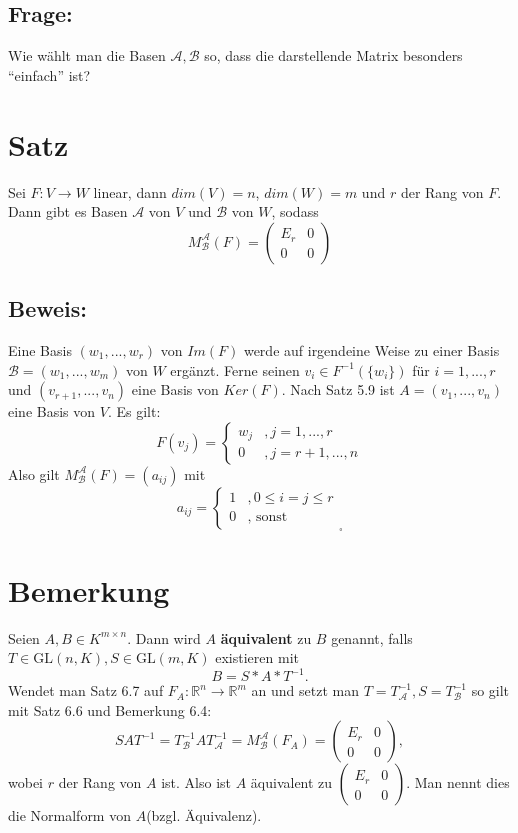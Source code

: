 \documentclass{scrbook}
\begin{document}
\subsection*{Frage:}
Wie wählt man die Basen $\mathscr{A},\mathscr{B}$ so, dass die darstellende Matrix besonders "`einfach"' ist?
\section{Satz} Sei $F:V\rightarrow W$ linear, dann $dim(V)=n$, $dim(W)=m$ und $r$ der Rang von $F$. Dann gibt es Basen $\mathscr{A}$ von $V$ und $\mathscr{B}$ von $W$, sodass \[
M^\mathscr{A}_\mathscr{B}(F)= \left(
\begin{array}{cc}
E_r&0\\
0&0
\end{array}
\right)
\]
\subsection*{Beweis:}
Eine Basis $(w_1,...,w_r)$ von $Im(F)$ werde auf irgendeine Weise zu einer Basis $\mathscr{B}=(w_1,...,w_m)$ von $W$ ergänzt. Ferne seinen $v_i \in F^{-1}(\{w_i\})$ für $i=1,...,r$ und $(v_{r+1},...,v_n)$ eine Basis von $Ker(F)$. Nach Satz 5.9 ist $A=(v_1,...,v_n)$ eine Basis von $V$. Es gilt:\[
F(v_j)=\left\{
\begin{array}{ll}
w_j&,j=1,...,r\\
0&,j=r+1,...,n
\end{array}
\right.
\]
Also gilt $M^\mathscr{A}_\mathscr{B}(F)=(a_{ij})$ mit
\[
a_{ij}= \left\{
\begin{array}{ll}
1&, 0\leq i=j \leq r\\
0&, \text{ sonst}
\end{array}
\right. _\square
\]
\section{Bemerkung}
Seien $A,B\in K^{m\times n}$. Dann wird $A$ \textbf{äquivalent} zu $B$ genannt, falls $T\in \text{GL}(n,K),S\in \text{GL}(m,K)$ existieren mit \[B=S*A*T^{-1}.\]Wendet man Satz 6.7 auf $F_A:\mathbb{R}^n \rightarrow \mathbb{R}^m$ an und setzt man $T=T^{-1}_\mathscr{A}, S=T^{-1}_\mathscr{B}$ so gilt mit Satz 6.6 und Bemerkung 6.4:\[SAT^{-1}=T^{-1}_\mathscr{B}AT^{-1}_\mathscr{A} = M^{\mathscr{A}}_{\mathscr{B}}(F_A)=
\left(
\begin{array}{cc}
E_r&0\\
0&0
\end{array}
\right),\]
wobei $r$ der Rang von $A$ ist. Also ist $A$ äquivalent zu $\left(\begin{array}{cc}
E_r&0\\
0&0
\end{array}\right)$.
Man nennt dies die Normalform von $A$(bzgl. Äquivalenz).
\end{document}
